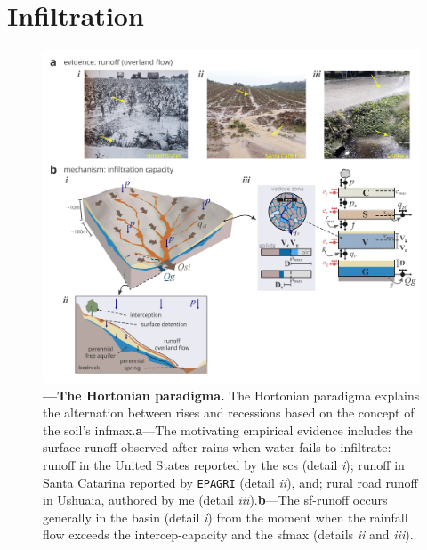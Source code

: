 \documentclass[./main_en.tex]{subfiles}
\begin{document}
\section{Infiltration} \label{sec:hydro:mechs}

\begin{figure}[t!] 
\centering				
\includegraphics[width=0.98\linewidth]{figs/fig_horton_en.jpg}		
\caption[The Hortonian \gls{paradigma}]
{
\textbf{---\;The Hortonian \gls{paradigma}.} The Hortonian \gls{paradigma} explains the alternation between rises and recessions based on the concept of the soil’s \gls{infmax}.\;\textbf{a}\;---\;The motivating empirical evidence includes the surface runoff observed after rains when water fails to infiltrate: runoff in the United States reported by the \acrshort{scs} \cite{strahler1986} (detail \textrm{\textit{i}}); runoff in Santa Catarina reported by \texttt{EPAGRI} \cite{epagri2024} (detail \textrm{\textit{ii}}), and; rural road runoff in Ushuaia, authored by me (detail \textrm{\textit{iii}}).\;\textbf{b}\;---\;The \gls{sf-runoff} occurs generally in the basin (detail \textrm{\textit{i}}) from the moment when the rainfall flow exceeds the \gls{intercep-capacity} and the \gls{sfmax} (details \textrm{\textit{ii}} and \textrm{\textit{iii}}).
}
\label{fig:hydro:horton} 		
\end{figure}
\end{document}
